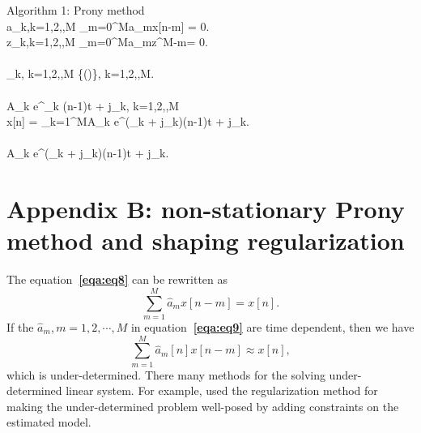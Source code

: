 \begin{algorithm}{Algorithm 1: Prony method}{}
       \\
     \displaystyle a_k,k=1,2,\cdots,M \gets \sum_{m=0}^{M}a_mx[n-m] = 0. \\
      \displaystyle z_k,k=1,2,\cdots,M \gets \sum_{m=0}^{M}a_mz^{M-m}= 0.\\
      \\  
     \displaystyle
     \omega_k, k=1,2,\cdots,M \gets \Re\left\{\left(\right)\right\}, k=1,2,\cdots,M.\\
      \displaystyle \\
     A_k e^{\alpha_k (n-1)\Delta t + j\phi_k}, k=1,2,\cdots,M \gets  \\
     x[n] = \sum_{k=1}^{M}A_k e^{(\alpha_k + j\omega_k)(n-1)\Delta t + j\phi_k}.\\
      \\
     \displaystyle  
     A_k e^{(\alpha_k + j\omega_k)(n-1)\Delta t + j\phi_k}. \\
\end{algorithm}


\section{Appendix B: non-stationary Prony method and shaping regularization}
The equation\textbf{~\ref{eqa:eq8}} can be rewritten as
\begin{equation}
    \label{eqa:eq9}
\sum_{m=1}^{M}\hat{a}_m x[n-m] = x[n].
\end{equation}
If the $\hat{a}_m, m=1,2,\cdots,M$ in equation\textbf{~\ref{eqa:eq9}} are time dependent, then we have
\begin{equation}
    \label{eqa:eq10}
    \sum_{m=1}^{M}\hat{a}_m[n] x[n-m] \approx x[n],
\end{equation}
which is under-determined. There many methods for the solving 
under-determined linear system. For example, \citet[]{tikhonov} 
used the regularization method for making the under-determined 
problem well-posed by adding constraints on the estimated model.
